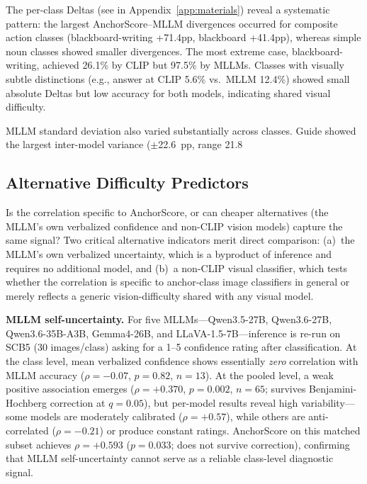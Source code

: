 \documentclass[a4paper,fleqn]{cas-sc}
\begin{document}
The per-class Deltas (see  in Appendix~\ref{app:materials}) reveal a systematic pattern: the largest AnchorScore--MLLM divergences occurred for composite action classes (blackboard-writing +71.4pp, blackboard +41.4pp), whereas simple noun classes showed smaller divergences. The most extreme case, blackboard-writing, achieved 26.1\% by CLIP but 97.5\% by MLLMs. Classes with visually subtle distinctions (e.g., answer at CLIP 5.6\% vs.\ MLLM 12.4\%) showed small absolute Deltas but low accuracy for both models, indicating shared visual difficulty.

MLLM standard deviation also varied substantially across classes. Guide showed the largest inter-model variance ($\pm$22.6~pp, range 21.8%

\subsection{Alternative Difficulty Predictors}
\label{sec:extended_baselines}

Is the correlation specific to AnchorScore, or can cheaper alternatives (the MLLM's own verbalized confidence and non-CLIP vision models) capture the same signal? Two critical alternative indicators merit direct comparison: (a)~the MLLM's own verbalized uncertainty, which is a byproduct of inference and requires no additional model, and (b)~a non-CLIP visual classifier, which tests whether the correlation is specific to anchor-class image classifiers in general or merely reflects a generic vision-difficulty shared with any visual model.

\textbf{MLLM self-uncertainty.} For five MLLMs---Qwen3.5-27B, Qwen3.6-27B, Qwen3.6-35B-A3B, Gemma4-26B, and LLaVA-1.5-7B---inference is re-run on SCB5 (30 images/class) asking for a 1--5 confidence rating after classification. At the class level, mean verbalized confidence shows essentially \emph{zero} correlation with MLLM accuracy ($\rho=-0.07$, $p=0.82$, $n=13$). At the pooled level, a weak positive association emerges ($\rho=+0.370$, $p=0.002$, $n=65$; survives Benjamini-Hochberg correction at $q=0.05$), but per-model results reveal high variability---some models are moderately calibrated ($\rho=+0.57$), while others are anti-correlated ($\rho=-0.21$) or produce constant ratings. AnchorScore on this matched subset achieves $\rho=+0.593$ ($p=0.033$; does not survive correction), confirming that MLLM self-uncertainty cannot serve as a reliable class-level diagnostic signal.
\end{document}

